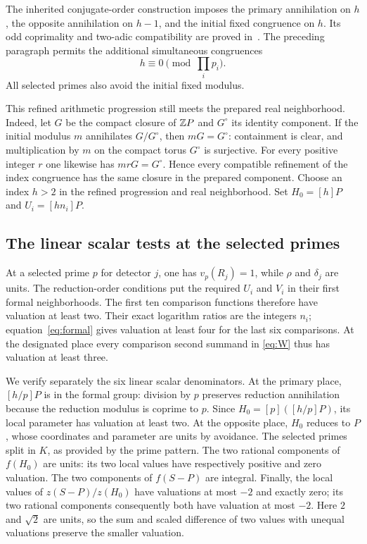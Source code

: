 \documentclass[11pt,a4paper]{article}
\begin{document}
The inherited conjugate-order construction imposes the primary
annihilation on $h$, the opposite annihilation on $h-1$, and the
initial fixed congruence on $h$. Its odd coprimality and two-adic
compatibility are proved in~\cite{Dependencies}. The preceding
paragraph permits the additional simultaneous congruences
\begin{equation}\label{eq:hcongruence}
                              h\equiv0\pmod{\prod_i p_i}.
\end{equation}
All selected primes also avoid the initial fixed modulus.

This refined arithmetic progression still meets the prepared real
neighborhood. Indeed, let $G$ be the compact closure of $\mathbb Z P$
and $G^\circ$ its identity component. If the initial modulus $m$
annihilates $G/G^\circ$, then $mG=G^\circ$: containment is clear,
and multiplication by $m$ on the compact torus $G^\circ$ is
surjective. For every positive integer $r$ one likewise has
$mrG=G^\circ$. Hence every compatible refinement of the index
congruence has the same closure in the prepared component.
Choose an index $h>2$ in the refined progression and real
neighborhood. Set $H_0=[h]P$ and $U_i=[hn_i]P$.

\subsection{The linear scalar tests at the selected primes}

At a selected prime $p$ for detector $j$, one has
$v_p(R_j)=1$, while $\rho$ and $\delta_j$ are units. The
reduction-order conditions put the required $U_i$ and $V_i$
in their first formal neighborhoods. The first ten comparison
functions therefore have valuation at least two. Their exact
logarithm ratios are the integers $n_i$; equation~\eqref{eq:formal}
gives valuation at least four for the last six comparisons.
At the designated place every comparison second summand in
\eqref{eq:W} thus has valuation at least three.

We verify separately the six linear scalar denominators. At the
primary place, $[h/p]P$ is in the formal group: division by $p$
preserves reduction annihilation because the reduction modulus
is coprime to $p$. Since $H_0=[p]([h/p]P)$, its local parameter
has valuation at least two. At the opposite place, $H_0$ reduces
to $P$, whose coordinates and parameter are units by avoidance.
The selected primes split in $K$, as provided by the prime pattern.
The two rational components of $f(H_0)$ are units: its two local
values have respectively positive and zero valuation. The two
components of $f(S-P)$ are integral. Finally, the local values
of $z(S-P)/z(H_0)$ have valuations at most $-2$ and exactly zero;
its two rational components consequently both have valuation at
most $-2$. Here $2$ and $\sqrt2$ are units, so the sum and
scaled difference of two values with unequal valuations preserve
the smaller valuation.
\end{document}
